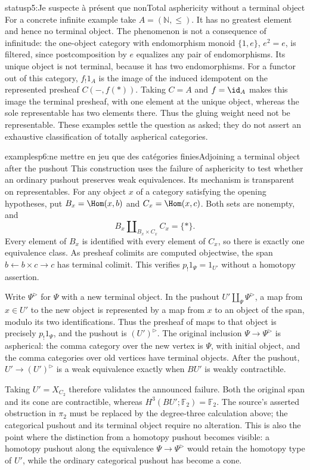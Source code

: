\begin{dcomment}{status}{p5:Je suspecte à présent que non}{Total asphericity without a terminal object}
For a concrete infinite example take \(A=(\mathbb N,\leq)\). It has no greatest element and hence no terminal object. The phenomenon is not a consequence of infinitude: the one-object category with endomorphism monoid \(\{1,e\}\), \(e^2=e\), is filtered, since postcomposition by \(e\) equalizes any pair of endomorphisms. Its unique object is not terminal, because it has two endomorphisms. For a functor out of this category, \(f_!1_A\) is the image of the induced idempotent on the represented presheaf \(C(-,f(*))\). Taking \(C=A\) and \(f=\id_A\) makes this image the terminal presheaf, with one element at the unique object, whereas the sole representable has two elements there. Thus the gluing weight need not be representable. These examples settle the question as asked; they do not assert an exhaustive classification of totally aspherical categories.
\end{dcomment}

\begin{dcomment}{examples}{p6:ne mettre en jeu que des catégories finies}{Adjoining a terminal object after the pushout}
This construction uses the failure of asphericity to test whether an ordinary pushout preserves weak equivalences. Its mechanism is transparent on representables. For any object $x$ of a category satisfying the opening hypotheses, put $B_x=\Hom(x,b)$ and $C_x=\Hom(x,c)$. Both sets are nonempty, and
\[
 B_x\amalg_{B_x\times C_x}C_x=\{*\}.
\]
Every element of $B_x$ is identified with every element of $C_x$, so there is exactly one equivalence class. As presheaf colimits are computed objectwise, the span $b\leftarrow b\times c\to c$ has terminal colimit. This verifies $p_!1_\Psi=1_{U'}$ without a homotopy assertion.

Write $\Psi^{\triangleright}$ for $\Psi$ with a new terminal object. In the pushout $U'\amalg_\Psi\Psi^{\triangleright}$, a map from $x\in U'$ to the new object is represented by a map from $x$ to an object of the span, modulo its two identifications. Thus the presheaf of maps to that object is precisely $p_!1_\Psi$, and the pushout is $(U')^{\triangleright}$. The original inclusion $\Psi\to\Psi^{\triangleright}$ is aspherical: the comma category over the new vertex is $\Psi$, with initial object, and the comma categories over old vertices have terminal objects. After the pushout, $U'\to(U')^{\triangleright}$ is a weak equivalence exactly when $BU'$ is weakly contractible.

Taking $U'=X_{C_2}$ therefore validates the announced failure. Both the original span and its cone are contractible, whereas $H^3(BU';\mathbb F_2)=\mathbb F_2$. The source's asserted obstruction in $\pi_2$ must be replaced by the degree-three calculation above; the categorical pushout and its terminal object require no alteration. This is also the point where the distinction from a homotopy pushout becomes visible: a homotopy pushout along the equivalence $\Psi\to\Psi^{\triangleright}$ would retain the homotopy type of $U'$, while the ordinary categorical pushout has become a cone.
\end{dcomment}

